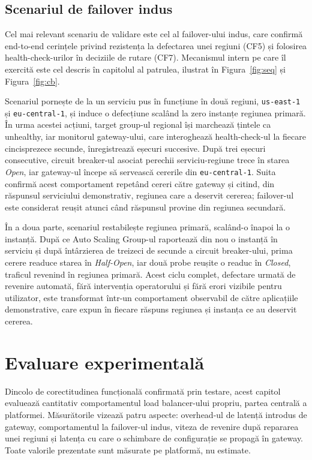 \documentclass[12pt,a4paper]{report}
\begin{document}
\section{Scenariul de failover indus}
Cel mai relevant scenariu de validare este cel al failover-ului indus, care confirmă end-to-end cerințele privind rezistența la defectarea unei regiuni (CF5) și folosirea health-check-urilor în deciziile de rutare (CF7). Mecanismul intern pe care îl exercită este cel descris în capitolul al patrulea, ilustrat în Figura~\ref{fig:seq} și Figura~\ref{fig:cb}.

Scenariul pornește de la un serviciu pus în funcțiune în două regiuni, \texttt{us-east-1} și \texttt{eu-central-1}, și induce o defecțiune scalând la zero instanțe regiunea primară. În urma acestei acțiuni, target group-ul regional își marchează țintele ca unhealthy, iar monitorul gateway-ului, care interoghează health-check-ul la fiecare cincisprezece secunde, înregistrează eșecuri succesive. După trei eșecuri consecutive, circuit breaker-ul asociat perechii serviciu-regiune trece în starea \emph{Open}, iar gateway-ul începe să servească cererile din \texttt{eu-central-1}. Suita confirmă acest comportament repetând cereri către gateway și citind, din răspunsul serviciului demonstrativ, regiunea care a deservit cererea; failover-ul este considerat reușit atunci când răspunsul provine din regiunea secundară.

În a doua parte, scenariul restabilește regiunea primară, scalând-o înapoi la o instanță. După ce Auto Scaling Group-ul raportează din nou o instanță în serviciu și după întârzierea de treizeci de secunde a circuit breaker-ului, prima cerere readuce starea în \emph{Half-Open}, iar două probe reușite o readuc în \emph{Closed}, traficul revenind în regiunea primară. Acest ciclu complet, defectare urmată de revenire automată, fără intervenția operatorului și fără erori vizibile pentru utilizator, este transformat într-un comportament observabil de către aplicațiile demonstrative, care expun în fiecare răspuns regiunea și instanța ce au deservit cererea.

\chapter{Evaluare experimentală}

Dincolo de corectitudinea funcțională confirmată prin testare, acest capitol evaluează cantitativ comportamentul load balancer-ului propriu, partea centrală a platformei. Măsurătorile vizează patru aspecte: overhead-ul de latență introdus de gateway, comportamentul la failover-ul indus, viteza de revenire după repararea unei regiuni și latența cu care o schimbare de configurație se propagă în gateway. Toate valorile prezentate sunt măsurate pe platformă, nu estimate.
\end{document}
